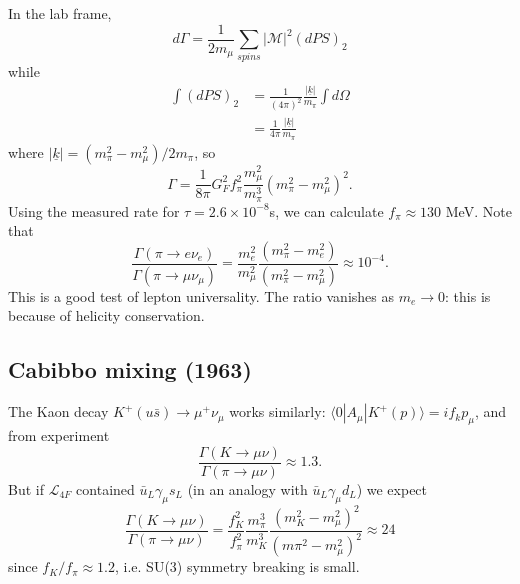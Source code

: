 \documentclass[a4paper,12pt]{article}
\begin{document}
In the lab frame,
\begin{equation}
    d\Gamma = \frac{1}{2m_\mu} \sum_{spins} |\mathcal{M}|^2(dPS)_2
\end{equation}
while
\begin{equation}
\begin{split}
\int(dPS)_2 &= \frac{1}{(4\pi)^2} \frac{|\underline{k}|}{m_\pi} \int d\Omega \\
&= \frac{1}{4\pi}\frac{|\underline{k}|}{m_\pi}
\end{split}
\end{equation}
where $|\underline{k}| = (m_\pi^2 - m_\mu^2)/2m_\pi$, so
\begin{equation}
\Gamma = \frac{1}{8\pi} G_F^2f_\pi^2 \frac{m_\mu^2}{m_\pi^3}(m_\pi^2 - m_\mu^2)^2.
\end{equation}
Using the measured rate for $\tau = 2.6 \times 10^{-8}$s, we can calculate $f_\pi \approx 130$ MeV. Note that 
\begin{equation}
\frac{\Gamma(\pi \to e \nu_e)}{\Gamma(\pi \to \mu \nu_\mu)} = \frac{m_e^2}{m_\mu^2}\frac{(m_\pi^2 - m_e^2)}{(m_\pi^2 - m_\mu^2)} \approx 10^{-4}.
\end{equation}
This is a good test of lepton universality. The ratio vanishes as $m_e \to 0$: this is because of helicity conservation. 
%
\subsection{Cabibbo mixing (1963)}
The Kaon decay $K^+ (u\bar{s}) \to \mu^+ \nu_\mu$ works similarly: $\langle 0 | A_\mu | K^+(p) \rangle = i f_k p_\mu$, and from experiment
\begin{equation}
    \frac{\Gamma(K \to \mu\nu)}{\Gamma(\pi \to \mu\nu)} \approx 1.3. 
\end{equation}
But if $\mathcal{L}_{4F}$ contained $\bar{u}_L \gamma_\mu s_L$ (in an analogy with $\bar{u}_L \gamma_\mu d_L$) we expect
\begin{equation}
    \frac{\Gamma(K \to \mu\nu)}{\Gamma(\pi \to \mu\nu)} = \frac{f_K^2}{f_\pi^2}\frac{m_\pi^3}{m_K^3}\frac{(m_K^2 - m_\mu^2)^2}{(m\pi^2 - m_\mu^2)^2} \approx 24
\end{equation}
since $f_K/f_\pi \approx 1.2$, i.e. SU(3) symmetry breaking is small.
\end{document}
